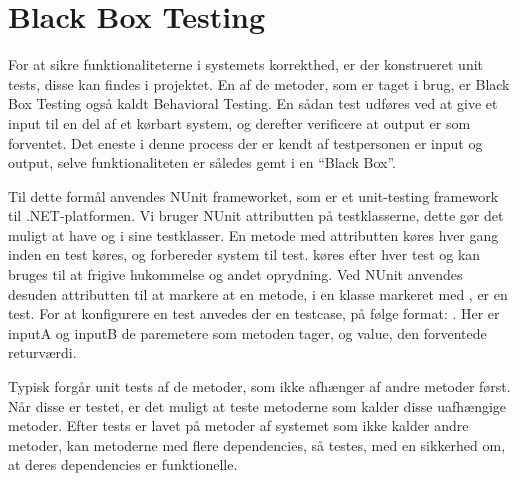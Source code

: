 \section{Black Box Testing}\label{BBtest}
For at sikre funktionaliteterne i systemets korrekthed, er der konstrueret unit tests, disse kan findes i  projektet.
En af de metoder, som er taget i brug, er Black Box Testing også kaldt Behavioral Testing.
En sådan test udføres ved at give et input til en del af et kørbart system, og derefter verificere at output er som forventet.
Det eneste i denne process der er kendt af testpersonen er input og output, selve funktionaliteten er således gemt i en ``Black Box''. \citep{Black_Box}

Til dette formål anvendes NUnit frameworket, som er et unit-testing framework til .NET-platformen.
Vi bruger NUnit attributten \class{[TestFixture]} på testklasserne, dette gør det muligt at have \class{[SetUp]} og \class{[TearDown]} i sine testklasser.
En metode med attributten \class{[Setup]} køres hver gang inden en test køres, og forbereder system til test.
\class{[TearDown]} køres efter hver test og kan bruges til at frigive hukommelse og andet oprydning. 
Ved NUnit anvendes desuden attributten  til at markere at en metode, i en klasse markeret med , er en test.
For at konfigurere en test anvedes der en testcase, på følge format: \class{[TestCase(inputA, inputB, Result=value)]}.
Her er inputA og inputB de paremetere som metoden tager, og value, den forventede returværdi.

Typisk forgår unit tests af de metoder, som ikke afhænger af andre metoder først.
Når disse er testet, er det muligt at teste metoderne som kalder disse uafhængige metoder. 
Efter tests er lavet på metoder af systemet som ikke kalder andre metoder, kan metoderne med flere dependencies, så testes, med en sikkerhed om, at deres dependencies er funktionelle.
\citep{Unit_Testing}

